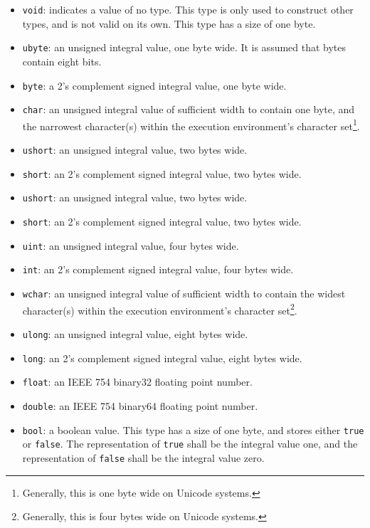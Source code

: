 \documentclass[letterpaper,12pt]{book}
\begin{document}
\begin{itemize}
	\item \texttt{void}: indicates a value of no type. This type is only used to construct other types, and is not valid on its own. This type has a size of one byte.
	
	\item \texttt{ubyte}: an unsigned integral value, one byte wide. It is assumed that bytes contain eight bits.
	
	\item \texttt{byte}: a 2's complement signed integral value, one byte wide.
	
	\item \texttt{char}: an unsigned integral value of sufficient width to contain one byte, and the narrowest character(s) within the execution environment's character set\footnote{Generally, this is one byte wide on Unicode systems.}.
	
	\item \texttt{ushort}: an unsigned integral value, two bytes wide.
	
	\item \texttt{short}: an 2's complement signed integral value, two bytes wide.
	
	\item \texttt{ushort}: an unsigned integral value, two bytes wide.
	
	\item \texttt{short}: an 2's complement signed integral value, two bytes wide.
	
	\item \texttt{uint}: an unsigned integral value, four bytes wide.
	
	\item \texttt{int}: an 2's complement signed integral value, four bytes wide.
	
	\item \texttt{wchar}: an unsigned integral value of sufficient width to contain the widest character(s) within the execution environment's character set\footnote{Generally, this is four bytes wide on Unicode systems.}.
	
	\item \texttt{ulong}: an unsigned integral value, eight bytes wide.
	
	\item \texttt{long}: an 2's complement signed integral value, eight bytes wide.
	
	\item \texttt{float}: an IEEE 754 binary32 floating point number.
	
	\item \texttt{double}: an IEEE 754 binary64 floating point number.
	
	\item \texttt{bool}: a boolean value. This type has a size of one byte, and stores either \texttt{true} or \texttt{false}. The representation of \texttt{true} shall be the integral value one, and the representation of \texttt{false} shall be the integral value zero.
\end{itemize}
\end{document}
